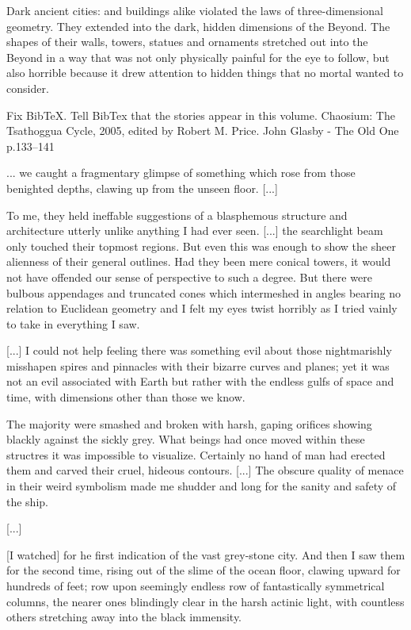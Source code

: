 Dark ancient cities: 
  \Draconian and \bane buildings alike violated the laws of three-dimensional geometry.
  They extended into the dark, hidden dimensions of the Beyond. 
  The shapes of their walls, towers, statues and ornaments stretched out into the Beyond in a way that was not only physically painful for the eye to follow, but also horrible because it drew attention to hidden things that no mortal wanted to consider. 

Fix BibTeX. Tell BibTex that the stories appear in this volume.
Chaosium: The Tsathoggua Cycle, 2005, edited by Robert M. Price. 
John Glasby - The Old One
p.133--141

  ... we caught a fragmentary glimpse of something which rose from those benighted depths, clawing up from the unseen floor. [...]
  
  To me, they held ineffable suggestions of a blasphemous structure and architecture utterly unlike anything I had ever seen. 
  [...] the searchlight beam only touched their topmost regions.
  But even this was enough to show the sheer alienness of their general outlines.
  Had they been mere conical towers, it would not have offended our sense of perspective to such a degree. 
  But there were bulbous appendages and truncated cones which intermeshed in angles bearing no relation to Euclidean geometry and I felt my eyes twist horribly as I tried vainly to take in everything I saw. 
  
  [...] 
  I could not help feeling there was something evil about those nightmarishly misshapen spires and pinnacles with their bizarre curves and planes; yet it was not an evil associated with Earth but rather with the endless gulfs of space and time, with dimensions other than those we know. 
  
  The majority were smashed and broken with harsh, gaping orifices showing blackly against the sickly grey.
  What beings had once moved within these structres it was impossible to visualize. 
  Certainly no hand of man had erected them and carved their cruel, hideous contours.
  [...]
  The obscure quality of menace in their weird symbolism made me shudder and long for the sanity and safety of the ship.
  
  [...]
  
  [I watched] for he first indication of the vast grey-stone city.
  And then I saw them for the second time, rising out of the slime of the ocean floor, clawing upward for hundreds of feet; row upon seemingly endless row of fantastically symmetrical columns, the nearer ones blindingly clear in the harsh actinic light, with countless others stretching away into the black immensity. 
  
